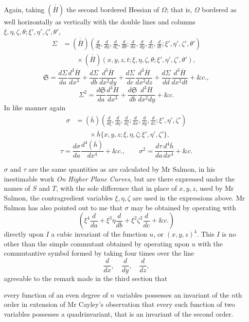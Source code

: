 \documentclass[11pt]{article}
\newcommand{\sourcepage}[1]{\marginpar{\scriptsize p.~#1}}
\begin{document}
{{Again, taking $(\overline{\overline H})$ the second bordered Hessian of $\Omega$; that is, $\Omega$ bordered as well horizontally as vertically with the double lines and columns $\xi,\eta,\zeta,\theta;\xi',\eta',\zeta',\theta'$,
\[
\begin{aligned}
\Sigma&=(\overline{\overline H})\!\left(
\frac{d}{d\xi},\frac{d}{d\eta},\frac{d}{d\zeta},\frac{d}{d\theta};
\frac{d}{dx},\frac{d}{dy},\frac{d}{dz},\frac{d}{dt};
\xi',\eta',\zeta',\theta'\right)\\
&\qquad{}\times
(\overline{\overline H})(x,y,z,t;\xi,\eta,\zeta,\theta;\xi',\eta',\zeta',\theta'),
\end{aligned}
\]
\[
\mathfrak{S}=\frac{d\Sigma}{da}\frac{d^3\overline H}{dx^3}
+\frac{d\Sigma}{db}\frac{d^3\overline H}{dx^2dy}
+\frac{d\Sigma}{dc}\frac{d^3\overline H}{dx^2dz}
+\frac{d\Sigma}{dd}\frac{d^3\overline H}{dx^2dt}+\&c.,
\]
\[
\Sigma^2=\frac{d\mathfrak{S}}{da}\frac{d^3\overline H}{dx^3}
+\frac{d\mathfrak{S}}{db}\frac{d^3\overline H}{dx^2dy}+\&c.
\]
In like manner again
\[
\begin{aligned}
\sigma&=(\overline h)\!\left(
\frac{d}{d\xi},\frac{d}{d\eta},\frac{d}{d\zeta};
\frac{d}{dx},\frac{d}{dy},\frac{d}{dz};
\xi',\eta',\zeta'\right)\\
&\qquad{}\times
\overline h\{x,y,z;\xi,\eta,\zeta;\xi',\eta',\zeta'\},
\end{aligned}
\]
\[
\tau=\frac{d\sigma}{da}\frac{d^4(\overline h)}{dx^4}+\&c.,
\qquad
\sigma^2=\frac{d\tau}{da}\frac{d^4\overline h}{dx^4}+\&c.
\]

$\sigma$ and $\tau$ are the same quantities as are calculated by Mr Salmon, in his inestimable work \emph{On Higher Plane Curves}, but are there expressed under the names of $S$ and $T$, with the sole difference that in place of $x,y,z$, used by Mr Salmon, the contragredient variables $\xi,\eta,\zeta$ are used in the expressions above. Mr Salmon has also pointed out to me that $\sigma$ may be obtained by operating with
\[
\left(\xi^4\frac{d}{da}+\xi^3\eta\frac{d}{db}
+\xi^2\zeta^2\frac{d}{dc}+\&c.\right)
\]
directly upon $I$ a cubic invariant of the function $u$, or $(x,y,z)^4$. This $I$ is no other than the simple commutant obtained by operating upon $u$ with the commutantive symbol formed by taking four times over the line
\[
\frac{d}{dx},\quad \frac{d}{dy},\quad \frac{d}{dz},
\]
agreeable to the remark made in the third section that

\sourcepage{331}
every function of an even degree of $n$ variables possesses an invariant of the $n$th order in extension of Mr Cayley's observation that every such function of two variables possesses a quadrinvariant, that is an invariant of the second order.

}}
\end{document}
